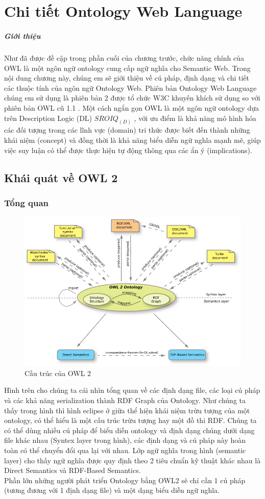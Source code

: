 \chapter{Chi tiết Ontology Web Language}
\paragraph{Giới thiệu }Như đã được đề cập trong phần cuối của chương trước, chức năng chính của OWL là một ngôn ngữ ontology cung cấp ngữ nghĩa cho Semantic Web. Trong nội dung chương này, chúng em sẽ giới thiệu về cú pháp, định dạng và chi tiết các thuộc tính của ngôn ngữ Ontology Web. Phiên bản Ontology Web Language chúng em sử dụng là phiên bản 2 \cite{owl2} được tổ chức W3C khuyến khích sử dụng so với phiên bản OWL cũ 1.1 . Một cách ngắn gọn OWL là một ngôn ngữ ontology dựa trên Description Logic (DL) $SROIQ_{(D)}$ \cite{DL}, với ưu điểm là khả năng mô hình hóa các đối tượng trong các lĩnh vực (domain) tri thức được biết đến thành những khái niệm (concept) và đồng thời là khả năng biểu diễn ngữ nghĩa mạnh mẽ, giúp việc suy luận có thể được thực hiện tự động thông qua các ẩn ý (implications).
\section{Khái quát về OWL 2}
\subsection{Tổng quan}
\begin{figure}[ht!]
	\centering
	\includegraphics[width=120mm]{Figures/owl2structure.png}
	\caption{Cấu trúc của OWL 2\label{overflow}}
\end{figure}
Hình trên cho chúng ta cái nhìn tổng quan về các định dạng file, các loại cú pháp và các khả năng serialization thành RDF Graph của Ontology. Như chúng ta thấy trong hình thì hình eclipse ở giữa thể hiện khái niệm trừu tượng của một ontology, có thể hiểu là một cấu trúc trừu tượng hay một đồ thi RDF. Chúng ta có thể dùng nhiều cú pháp để biểu diễn ontology và định dạng chúng dưới dạng file khác nhau (Syntex layer trong hình), các định dạng và cú pháp này hoàn toàn có thể chuyển đổi qua lại với nhau. Lớp ngữ nghĩa trong hình (semantic layer) cho thấy ngữ nghĩa được quy định theo 2 tiêu chuẩn kỹ thuật khác nhau là Direct Semantics và RDF-Based Semantics.
\\
Phần lớn những người phát triển Ontology bằng OWL2 sẽ chỉ cần 1 cú pháp (tương đương với 1 định dạng file) và một dạng biểu diễn ngữ nghĩa.
